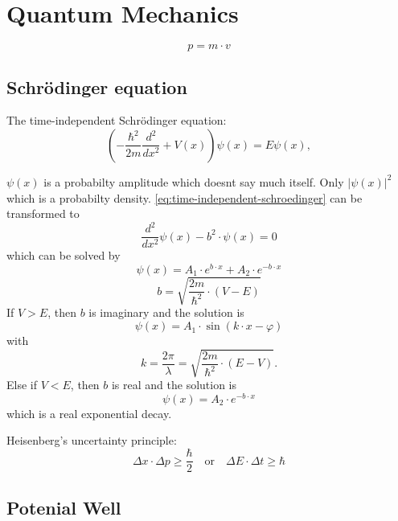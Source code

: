 \section{Quantum Mechanics}
\begin{equation}
    p = m \cdot v
\end{equation}
\subsection{Schrödinger equation}
The time-independent Schrödinger equation:
\begin{equation}
    \label{eq:time-independent-schroedinger}
\left(-\frac{\hbar^2}{2m} \frac{d^2}{dx^2} + V(x)\right) \psi(x) = E \psi(x),
\end{equation}

\(\psi(x)\) is a probabilty amplitude which doesnt say much itself. Only \(|\psi(x)|^2\) which is a probabilty density.
\cref{eq:time-independent-schroedinger} can be transformed to 
\begin{equation}
    \frac{d^2}{dx^2} \psi(x) - b^2 \cdot \psi(x) = 0
\end{equation}
which can be solved by
\begin{equation}
    \psi(x) = A_1 \cdot e^{b \cdot x} + A_2 \cdot e^{-b \cdot x}
\end{equation}
\begin{equation}
    b = \sqrt{\frac{2m}{\hbar^2}\cdot (V-E)}
\end{equation}
If \(V > E\), then \(b\) is imaginary and the solution is
\begin{equation}
    \psi(x) = A_1 \cdot \sin(k \cdot x - \varphi)
\end{equation}
with
\begin{equation}
    k =\frac{2\pi}{\lambda} =  \sqrt{\frac{2m}{\hbar^2}\cdot (E-V)}.
\end{equation}
Else if \(V < E\), then \(b\) is real and the solution is
\begin{equation}
    \psi(x) = A_2 \cdot e^{-b \cdot x}
\end{equation}
which is a real exponential decay.

Heisenberg's uncertainty principle:
\begin{equation}
    \Delta x \cdot \Delta p \geq \frac{\hbar}{2}\quad \text{or}\quad \Delta E \cdot \Delta t \geq \hbar
\end{equation}

\subsection{Potenial Well}
